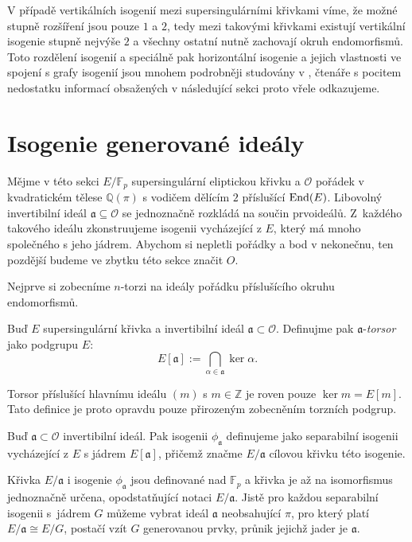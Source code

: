 \documentclass[12pt]{report}
\begin{document}
V případě vertikálních isogenií mezi supersingulárními křivkami víme, že možné stupně rozšíření jsou pouze $1$ a $2$, tedy mezi takovými křivkami existují vertikální isogenie stupně nejvýše $2$ a všechny ostatní nutně zachovají okruh endomorfismů. Toto rozdělení isogenií a speciálně pak horizontální isogenie a jejich vlastnosti ve spojení s grafy isogenií jsou mnohem podrobněji studovány v \cite[Ch. 4.]{Suchanek}, čtenáře s pocitem nedostatku informací obsažených v následující sekci proto vřele odkazujeme. 

\section{Isogenie generované ideály}

Mějme v této sekci $E/\mathbb{F}_p$ supersingulární eliptickou křivku a $\mathcal{O}$ pořádek v kvadratickém tělese $\mathbb{Q}(\pi)$ s vodičem dělícím $2$ příslušící $\operatorname{End}(E)$. Libovolný invertibilní ideál $\mathfrak{a} \subseteq \mathcal{O}$ se jednoznačně rozkládá na součin prvoideálů. Z~každého takového ideálu zkonstruujeme isogenii vycházející z $E$, který má mnoho společného s jeho jádrem. Abychom si nepletli pořádky a bod v nekonečnu, ten pozdější budeme ve zbytku této sekce značit $O$.

Nejprve si zobecníme $n$-torzi na ideály pořádku příslušícího okruhu endomorfismů.

\begin{definice}
Buď $E$ supersingulární křivka a invertibilní ideál $\mathfrak{a} \subset \mathcal{O}$.  Definujme pak $\mathfrak{a}$-\textit{torsor} jako podgrupu $E$:
\begin{equation*}
E[\mathfrak{a}] := \bigcap_{\alpha \in \mathfrak{a}} \ker \alpha.
\end{equation*}
\end{definice}

Torsor příslušící hlavnímu ideálu $(m)$ s $m \in \mathbb{Z}$ je roven pouze $\ker m = E[m]$. Tato definice je proto opravdu pouze přirozeným zobecněním torzních podgrup. 

\begin{definice}
Buď $\mathfrak{a} \subset \mathcal{O}$ invertibilní ideál. Pak isogenii $\phi_{\mathfrak{a}}$ definujeme jako separabilní isogenii vycházející z $E$ s jádrem $E[\mathfrak{a}]$, přičemž značme $E/\mathfrak{a}$ cílovou křivku této isogenie.
\end{definice}

Křivka $E/\mathfrak{a}$ i isogenie $\phi_{\mathfrak{a}}$ jsou definované nad $\mathbb{F}_p$ a křivka je až na isomorfismus jednoznačně určena, opodstatňující notaci $E/\mathfrak{a}$. Jistě pro každou separabilní isogenii s~jádrem $G$ můžeme vybrat ideál $\mathfrak{a}$ neobsahující $\pi$, pro který platí $E/\mathfrak{a} \cong E/G$, postačí vzít $G$ generovanou prvky, průnik jejichž jader je $\mathfrak{a}$. 
\end{document}
